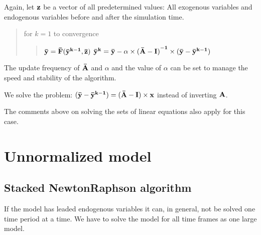 \documentclass[letterpaper,10pt,english]{jupyterBook}
\begin{document}
\sphinxAtStartPar
Again, let \(\bf{z}\) be a vector of all predetermined values: All exogenous variables and endogenous variables before and after the simulation time.
\begin{quote}

\sphinxAtStartPar
for \(k = 1\) to convergence
\begin{quote}

\sphinxAtStartPar
\(\bf{\bar y} = \bf{\bar F(\bar y^{k-1},\bar z) }\)
\(\bf{\bar y^{k}} =  \bf{\bar y} - \alpha \times \bf{(\bar A-I)}^{-1}\times ( \bf{\bar y - \bar y^{k-1}})\)
\end{quote}
\end{quote}

\sphinxAtStartPar
The update frequency of \(\bf{\bar A}\) and \(\alpha\) and the value of \(\alpha\) can be set to manage the speed and stability of the algorithm.

\sphinxAtStartPar
We solve the problem: \((\bf{\bar y - \bar y^{k-1} }) = \bf{(\bar A-I)}\times \bf{x}\) instead of inverting  \(\bf{A}\).

\sphinxAtStartPar
The comments above on solving the sets of linear equations also apply for this case.


\section{Un\sphinxhyphen{}normalized model}
\label{\detokenize{content/notebooks/intro/model and solution:un-normalized-model}}

\subsection{Stacked Newton\sphinxhyphen{}Raphson algorithm}
\label{\detokenize{content/notebooks/intro/model and solution:stacked-newton-raphson-algorithm}}
\sphinxAtStartPar
If the model has leaded endogenous variables it can, in general, not be solved one time period at a time. We have to solve the model for all time frames as one large model.
\end{document}
